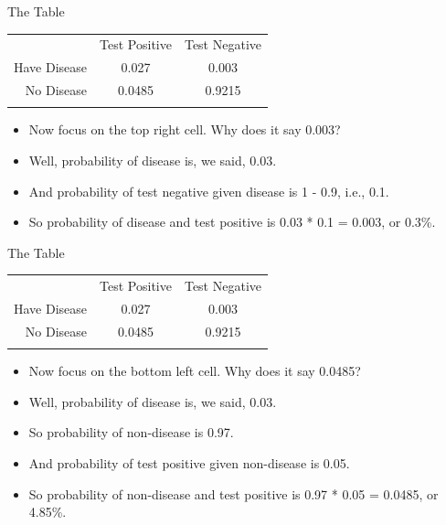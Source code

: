 \documentclass[
  ignorenonframetext,
]{beamer}
\providecommand{\tightlist}{%
  \setlength{\itemsep}{0pt}\setlength{\parskip}{0pt}}
\renewcommand{\,}{\text{, }}
\begin{document}
\begin{frame}{The Table}
\protect\hypertarget{the-table-2}{}
\begin{longtable}[]{@{}rcc@{}}
\toprule
& Test Positive & Test Negative \\ \addlinespace
\midrule
\endhead
Have Disease & 0.027 & 0.003 \\ \addlinespace
No Disease & 0.0485 & 0.9215 \\ \addlinespace
\bottomrule
\end{longtable}

\begin{itemize}
\tightlist
\item
  Now focus on the top right cell. Why does it say 0.003?
\item
  Well, probability of disease is, we said, 0.03.
\item
  And probability of test negative given disease is 1 - 0.9, i.e., 0.1.
\item
  So probability of disease and test positive is 0.03 * 0.1 = 0.003, or
  0.3\%.
\end{itemize}
\end{frame}

\begin{frame}{The Table}
\protect\hypertarget{the-table-3}{}
\begin{longtable}[]{@{}rcc@{}}
\toprule
& Test Positive & Test Negative \\ \addlinespace
\midrule
\endhead
Have Disease & 0.027 & 0.003 \\ \addlinespace
No Disease & 0.0485 & 0.9215 \\ \addlinespace
\bottomrule
\end{longtable}

\begin{itemize}
\tightlist
\item
  Now focus on the bottom left cell. Why does it say 0.0485?
\item
  Well, probability of disease is, we said, 0.03.
\item
  So probability of non-disease is 0.97.
\item
  And probability of test positive given non-disease is 0.05.
\item
  So probability of non-disease and test positive is 0.97 * 0.05 =
  0.0485, or 4.85\%.
\end{itemize}
\end{frame}
\end{document}
